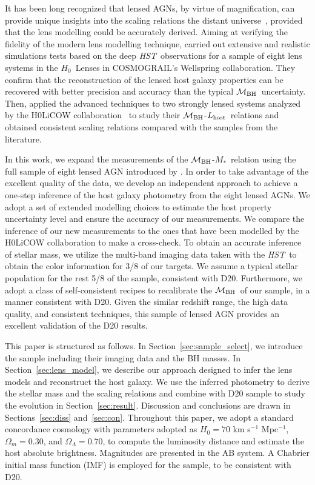 \documentclass[fleqn,usenatbib]{mnras}
\newcommand{\hst}{{\it HST}}
\newcommand{\hc}{$H_0$}
\newcommand{\mbh}{$\mathcal M_{\rm BH}$}
\newcommand{\lhost}{$L_{\rm host}$}
\newcommand{\mstar}{{$M_*$}}
\begin{document}
It has been long recognized that lensed AGNs, by virtue of magnification, can provide unique insights into the scaling relations the distant universe~\citep{Peng2006}, provided that the lens modelling could be accurately derived. Aiming at verifying the fidelity of the modern lens modelling technique, \citet{Ding2017a} carried out extensive and realistic simulations tests based on the deep \hst\ observations for a sample of eight lens systems in the \hc\ Lenses in COSMOGRAIL's Wellspring \citep[H0LiCOW\footnote{\url{http://www.h0licow.org/}},][]{Suyu2017} collaboration. They confirm that the reconstruction of the lensed host galaxy properties can be recovered with better precision and accuracy than the typical \mbh\ uncertainty. Then, \citet{Ding2017b} applied the advanced techniques to two strongly lensed systems analyzed by the H0LiCOW collaboration~\citep{Suyu2013, Wong2017} to study their \mbh-\lhost\ relations and obtained consistent scaling relations compared with the samples from the literature.

In this work, we expand the measurements of the \mbh-\mstar\ relation using the full sample of eight lensed AGN introduced by \citet{Ding2017a}.  In order to take advantage of the excellent quality of the data, we develop an independent approach to achieve a one-step inference of the host galaxy photometry from the eight lensed AGNs. We adopt a set of extended modelling choices to estimate the host property uncertainty level and ensure the accuracy of our measurements. We compare the inference of our new measurements to the ones that have been modelled by the H0LiCOW collaboration to make a cross-check. To obtain an accurate inference of stellar mass, we utilize the multi-band imaging data taken with the \hst\ to obtain the color information for 3/8 of our targets. We assume a typical stellar population for the rest 5/8 of the sample, consistent with D20. Furthermore, we adopt a class of self-consistent recipes to recalibrate the \mbh\ of our sample, in a manner consistent with D20. Given the similar redshift range, the high data quality, and consistent techniques, this sample of lensed AGN provides an excellent validation of the D20 results.

This paper is structured as follows. In Section~\ref{sec:sample_select}, we introduce the sample including their imaging data and the BH masses. In Section~\ref{sec:lens_model}, we describe our approach designed to infer the lens models and reconstruct the host galaxy. We use the inferred photometry to derive the stellar mass and the scaling relations and combine with D20 sample to study the evolution in Section~\ref{sec:result}. Discussion and conclusions are drawn in Sections~\ref{sec:diss} and~\ref{sec:con}. Throughout this paper, we adopt a standard concordance cosmology with parameters adopted as $H_0= 70$ km s$^{-1}$ Mpc$^{-1}$, $\Omega{_m} = 0.30$, and $\Omega{_\Lambda} = 0.70$, to compute the luminosity distance and estimate the host absolute brightness. Magnitudes are presented in the AB system. A Chabrier initial mass function (IMF) is employed for the sample, to be consistent with D20.
\end{document}
